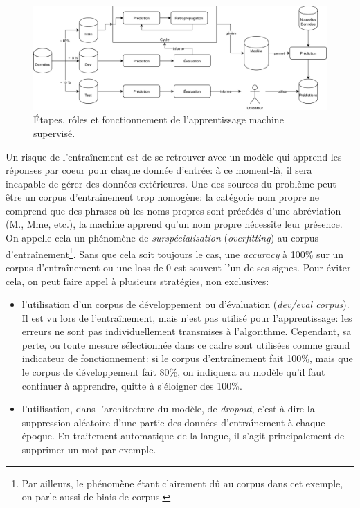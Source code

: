\begin{figure}[h]
    \centering
    \includegraphics[width=\linewidth]{results/deep-learning/explanations/MachineLearning.png}
    \caption{Étapes, rôles et fonctionnement de l'apprentissage machine supervisé.}
    \label{fig:deep-learning:fonctionnement}
\end{figure}

\label{deep-learning:overfitting}
Un risque de l'entraînement est de se retrouver avec un modèle qui apprend les réponses par coeur pour chaque donnée d'entrée: à ce moment-là, il sera incapable de gérer des données extérieures. Une des sources du problème peut-être un corpus d'entraînement trop homogène: la catégorie nom propre ne comprend que des phrases où les noms propres sont précédés d'une abréviation (M., Mme, etc.), la machine apprend qu'un nom propre nécessite leur présence. On appelle cela un phénomène de \textit{surspécialisation} (\textit{overfitting}) au corpus d'entraînement\footnote{Par ailleurs, le phénomène étant clairement dû au corpus dans cet exemple, on parle aussi de biais de corpus.}. Sans que cela soit toujours le cas, une \textit{accuracy} à 100\% sur un corpus d'entraînement ou une loss de 0 est souvent l'un de ses signes. Pour éviter cela, on peut faire appel à plusieurs stratégies, non exclusives:
\begin{itemize}
    \item l'utilisation d'un corpus de développement ou d'évaluation (\textit{dev/eval corpus}). Il est vu lors de l'entraînement, mais n'est pas utilisé pour l'apprentissage: les erreurs ne sont pas individuellement transmises à l'algorithme. Cependant, sa perte, ou toute mesure sélectionnée dans ce cadre sont utilisées comme grand indicateur de fonctionnement: si le corpus d'entraînement fait 100\%, mais que le corpus de développement fait 80\%, on indiquera au modèle qu'il faut continuer à apprendre, quitte à s'éloigner des 100\%.
    \item l'utilisation, dans l'architecture du modèle, de \textit{dropout}, c'est-à-dire la suppression aléatoire d'une partie des données d'entraînement à chaque époque. En traitement automatique de la langue, il s'agit principalement de supprimer un mot par exemple.
\end{itemize}

